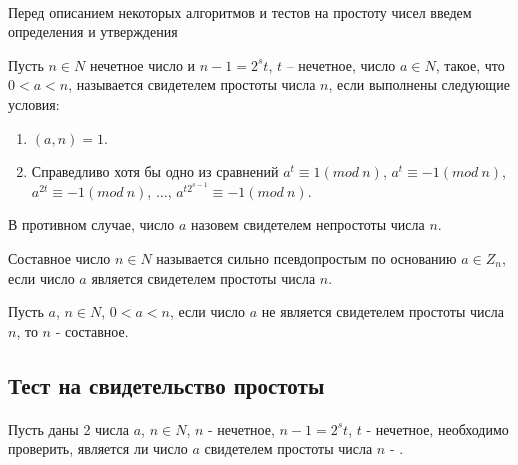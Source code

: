 \paragraph{} Перед описанием некоторых алгоритмов и тестов на простоту чисел введем определения и утверждения

  \begin{definition}    
  
      Пусть {$n \in N$} нечетное число и {$n - 1 = 2^{ s} t$}, {$t$} – нечетное,
    число {$a \in N$}, такое, что {$0 < a < n$}, называется свидетелем 
    простоты числа {$n$}, если выполнены следующие условия:

    \begin{enumerate}
      \item {$(a, n) = 1$}.
      \item Справедливо хотя бы одно из сравнений {$a^{ t} \equiv 1 (mod \: n)$}, 
	       {$a^{ t} \equiv -1 (mod \: n)$}, {$a^{ 2 t} \equiv -1(mod \: n)$},
	       {$\dots$}, {$a^{ t 2^{ s-1}} \equiv -1(mod \: n)$}.
    \end{enumerate}
    В противном случае, число $a$ назовем свидетелем непростоты числа $n$.
  
  \end{definition}

  \begin{definition}    
  
      Составное число {$n \in N$} называется сильно псевдопростым по основанию {$a 
    \in Z_{ n}$}, если число {$a$} является свидетелем простоты числа {$n$}.
    
  \end{definition}

  \begin{statement}   
  
      Пусть {$a$}, {$n \in N$}, {$0 < a < n$}, если число {$a$} не является свидетелем 
    простоты числа {$n$}, то {$n$} - составное.
    
  \end{statement}

\subsection{Тест на свидетельство простоты}

\paragraph{} Пусть даны 2 числа {$a$}, {$n \in N$}, {$n$} - нечетное, {$n - 1 = 2^{s} t$}, 
{$t$} - нечетное, необходимо проверить, является ли число {$a$} свидетелем простоты числа {$n$} - \cite[Глава 5, страницы 169-170]{mah06}.


